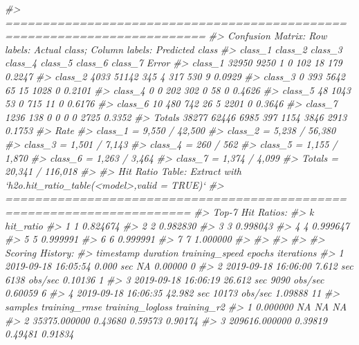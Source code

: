 \documentclass[]{book}
\newenvironment{Shaded}{\begin{snugshade}}{\end{snugshade}}
\newcommand{\CommentTok}[1]{\textcolor[rgb]{0.56,0.35,0.01}{\textit{#1}}}
\begin{document}
\begin{Shaded}
\begin{Highlighting}[]
{{{{{{{{{{{{{{\CommentTok{#> =========================================================================}
\CommentTok{#> Confusion Matrix: Row labels: Actual class; Column labels: Predicted class}
\CommentTok{#>         class_1 class_2 class_3 class_4 class_5 class_6 class_7  Error}
\CommentTok{#> class_1   32950    9250       1       0     102      18     179 0.2247}
\CommentTok{#> class_2    4033   51142     345       4     317     530       9 0.0929}
\CommentTok{#> class_3       0     393    5642      65      15    1028       0 0.2101}
\CommentTok{#> class_4       0       0     202     302       0      58       0 0.4626}
\CommentTok{#> class_5      48    1043      53       0     715      11       0 0.6176}
\CommentTok{#> class_6      10     480     742      26       5    2201       0 0.3646}
\CommentTok{#> class_7    1236     138       0       0       0       0    2725 0.3352}
\CommentTok{#> Totals    38277   62446    6985     397    1154    3846    2913 0.1753}
\CommentTok{#>                       Rate}
\CommentTok{#> class_1 =   9,550 / 42,500}
\CommentTok{#> class_2 =   5,238 / 56,380}
\CommentTok{#> class_3 =    1,501 / 7,143}
\CommentTok{#> class_4 =        260 / 562}
\CommentTok{#> class_5 =    1,155 / 1,870}
\CommentTok{#> class_6 =    1,263 / 3,464}
\CommentTok{#> class_7 =    1,374 / 4,099}
\CommentTok{#> Totals  = 20,341 / 116,018}
\CommentTok{#> }
\CommentTok{#> Hit Ratio Table: Extract with `h2o.hit_ratio_table(<model>,valid = TRUE)`}
\CommentTok{#> =======================================================================}
\CommentTok{#> Top-7 Hit Ratios: }
\CommentTok{#>   k hit_ratio}
\CommentTok{#> 1 1  0.824674}
\CommentTok{#> 2 2  0.982830}
\CommentTok{#> 3 3  0.998043}
\CommentTok{#> 4 4  0.999647}
\CommentTok{#> 5 5  0.999991}
\CommentTok{#> 6 6  0.999991}
\CommentTok{#> 7 7  1.000000}
\CommentTok{#> }
\CommentTok{#> }
\CommentTok{#> }
\CommentTok{#> }
\CommentTok{#> Scoring History: }
\CommentTok{#>             timestamp   duration training_speed  epochs iterations}
\CommentTok{#> 1 2019-09-18 16:05:54  0.000 sec             NA 0.00000          0}
\CommentTok{#> 2 2019-09-18 16:06:00  7.612 sec   6138 obs/sec 0.10136          1}
\CommentTok{#> 3 2019-09-18 16:06:19 26.612 sec   9090 obs/sec 0.60059          6}
\CommentTok{#> 4 2019-09-18 16:06:35 42.982 sec  10173 obs/sec 1.09888         11}
\CommentTok{#>         samples training_rmse training_logloss training_r2}
\CommentTok{#> 1      0.000000            NA               NA          NA}
\CommentTok{#> 2  35375.000000       0.43680          0.59573     0.90174}
\CommentTok{#> 3 209616.000000       0.39819          0.49481     0.91834}
}}}}}}}}}}}}}}
\end{Highlighting}
\end{Shaded}
\end{document}
